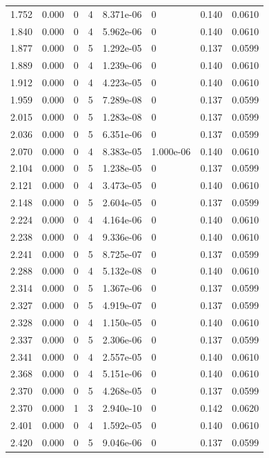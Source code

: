 \documentclass[preview]{standalone}
\begin{document}
{{{\begin{tabular}{L{1.2cm}C{1.2cm} C{0.3cm}C{0.5cm} C{1.4cm}C{1.4cm} C{1.4cm}C{1.4cm}}
  1.752  &  0.000  & 0     &  4 &  8.371e-06  & 0  & 0.140 &  0.0610   \\ 
  1.840  &  0.000  & 0     &  4 &  5.962e-06  & 0  & 0.140 &  0.0610   \\ 
  1.877  &  0.000  & 0     &  5 &  1.292e-05  & 0  & 0.137 &  0.0599   \\ 
  1.889  &  0.000  & 0     &  4 &  1.239e-06  & 0  & 0.140 &  0.0610   \\ 
  1.912  &  0.000  & 0     &  4 &  4.223e-05  & 0  & 0.140 &  0.0610   \\ 
  1.959  &  0.000  & 0     &  5 &  7.289e-08  & 0  & 0.137 &  0.0599   \\ 
  2.015  &  0.000  & 0     &  5 &  1.283e-08  & 0  & 0.137 &  0.0599   \\ 
  2.036  &  0.000  & 0     &  5 &  6.351e-06  & 0  & 0.137 &  0.0599   \\ 
  2.070  &  0.000  & 0     &  4 &  8.383e-05  & 1.000e-06  & 0.140 &  0.0610   \\ 
  2.104  &  0.000  & 0     &  5 &  1.238e-05  & 0  & 0.137 &  0.0599   \\ 
  2.121  &  0.000  & 0     &  4 &  3.473e-05  & 0  & 0.140 &  0.0610   \\ 
  2.148  &  0.000  & 0     &  5 &  2.604e-05  & 0  & 0.137 &  0.0599   \\ 
  2.224  &  0.000  & 0     &  4 &  4.164e-06  & 0  & 0.140 &  0.0610   \\ 
  2.238  &  0.000  & 0     &  4 &  9.336e-06  & 0  & 0.140 &  0.0610   \\ 
  2.241  &  0.000  & 0     &  5 &  8.725e-07  & 0  & 0.137 &  0.0599   \\ 
  2.288  &  0.000  & 0     &  4 &  5.132e-08  & 0  & 0.140 &  0.0610   \\ 
  2.314  &  0.000  & 0     &  5 &  1.367e-06  & 0  & 0.137 &  0.0599   \\ 
  2.327  &  0.000  & 0     &  5 &  4.919e-07  & 0  & 0.137 &  0.0599   \\ 
  2.328  &  0.000  & 0     &  4 &  1.150e-05  & 0  & 0.140 &  0.0610   \\ 
  2.337  &  0.000  & 0     &  5 &  2.306e-06  & 0  & 0.137 &  0.0599   \\ 
  2.341  &  0.000  & 0     &  4 &  2.557e-05  & 0  & 0.140 &  0.0610   \\ 
  2.368  &  0.000  & 0     &  4 &  5.151e-06  & 0  & 0.140 &  0.0610   \\ 
  2.370  &  0.000  & 0     &  5 &  4.268e-05  & 0  & 0.137 &  0.0599   \\ 
  2.370  &  0.000  & 1     &  3 &  2.940e-10  & 0  & 0.142 &  0.0620   \\ 
  2.401  &  0.000  & 0     &  4 &  1.592e-05  & 0  & 0.140 &  0.0610   \\ 
  2.420  &  0.000  & 0     &  5 &  9.046e-06  & 0  & 0.137 &  0.0599   \\ 
\hline 
\end{tabular} 

}}}
\end{document}
